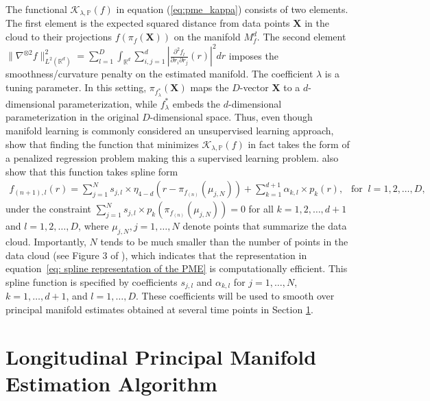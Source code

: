 \documentclass[12pt]{article}
\theoremstyle{definition}
\begin{document}
The functional $\mathcal{K}_{\lambda, \mathbb{P}}(f)$ in equation (\ref{eq:pme_kappa}) consists of two elements. The first element is the expected squared distance from data points $\mathbf{X}$ in the cloud to their projections $f(\pi_f(\mathbf{X}))$ on the manifold $M_f^d$. The second element $\|\nabla^{\otimes 2}f\|_{L^2(\mathbb{R}^{d})}^2 = \sum_{l=1}^{D} \int_{\mathbb{R}^{d}}\sum_{i, j = 1}^{d}\left|\frac{\partial^2f_l}{\partial r_i \partial r_j}(r)\right|^2dr$ imposes the smoothness/curvature penalty on the estimated manifold. The coefficient $\lambda$ is a tuning parameter. In this setting,  $\pi_{f_{\lambda}^{*}}(\mathbf{X})$ maps the $D$-vector $\mathbf{X}$ to a $d$-dimensional parameterization, while $f_{\lambda}^{*}$ embeds the $d$-dimensional parameterization in the original $D$-dimensional space. Thus, even though manifold learning is commonly considered an unsupervised learning approach, \cite{mengPrincipalManifoldEstimation2021} show that finding the function that minimizes $\mathcal{K}_{\lambda, \mathbb{P}}(f)$ in fact takes the form of a penalized regression problem making this a supervised learning problem. \cite{mengPrincipalManifoldEstimation2021} also show that this function takes spline form
\begin{align}\label{eq: spline representation of the PME}
    f_{(n+1), l}(r) = \sum_{j=1}^N s_{j, l} \times \eta_{4-d}\left(r - \pi_{f_{(n)}}(\mu_{j, N})\right) + \sum_{k=1}^{d + 1}\alpha_{k, l} \times p_k(r), \ \ \text{ for } \ l = 1, 2, \dots, D,
\end{align}
under the constraint $\sum_{j=1}^{N}s_{j, l} \times p_{k}\left(\pi_{f_{(n)}}(\mu_{j, N})\right) = 0$ for all $k = 1, 2, \dots, d + 1$ and $l = 1, 2, \dots, D$, where $\mu_{j, N}, j = 1, \dots, N$ denote points that summarize the data cloud. Importantly, $N$ tends to be much smaller than the number of points in the data cloud (see Figure 3 of \cite{mengPrincipalManifoldEstimation2021}), which indicates that the representation in equation~\eqref{eq: spline representation of the PME} is computationally efficient. This spline function is specified by coefficients $s_{j, l}$ and $\alpha_{k, l}$ for $j = 1, \dots, N$, $k = 1, \dots, d+1$, and $l = 1, \dots, D$. These coefficients will be used to smooth over principal manifold estimates obtained at several time points in Section \ref{s:LPME}.






\section{Longitudinal Principal Manifold Estimation Algorithm}\label{s:LPME}
\end{document}
